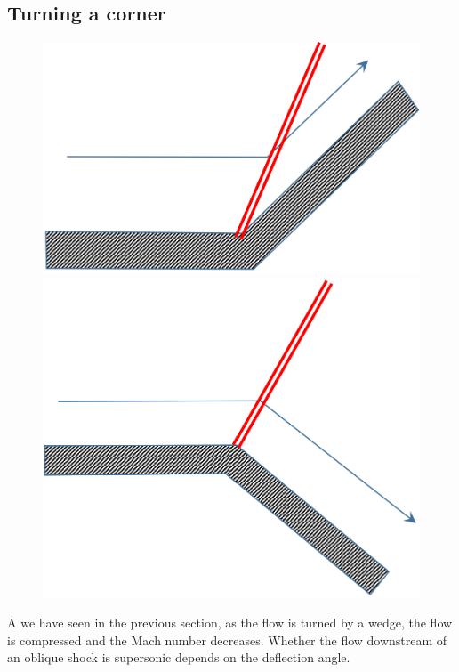 \documentclass[class=report, crop=false, 12pt,a4paper]{standalone}
\begin{document}
\subsection{Turning a corner}
\begin{figure}[H]
    \centering
    \begin{minipage}{.5\textwidth}
        \centering
        \includegraphics[width=.8\linewidth]{../img/diagram20.png}
    \end{minipage}%
    \begin{minipage}{.5\textwidth}
        \centering
        \includegraphics[width=.8\linewidth]{../img/diagram21.png}
    \end{minipage}
\end{figure}
A we have seen in the previous section, as the flow is turned by a wedge, the flow is compressed and the Mach number decreases. Whether the flow downstream of an oblique shock is supersonic depends on the deflection angle.
\end{document}
